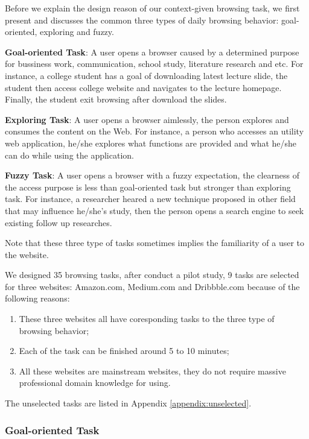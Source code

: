 Before we explain the design reason of our context-given browsing task, we first present
and discusses the common three types of daily browsing behavior: goal-oriented, exploring and fuzzy. 

\textbf{Goal-oriented Task}: A user opens a browser caused by a determined purpose for bussiness work, communication,
school study, literature research and etc.
For instance, a college student has a goal of downloading latest lecture slide, the student then
access college website and navigates to the lecture homepage. Finally, the student exit 
browsing after download the slides.

\textbf{Exploring Task}: A user opens a browser aimlessly, the person explores and consumes the content
on the Web. For instance, a person who accesses an utility web application, he/she explores
what functions are provided and what he/she can do while using the application.

\textbf{Fuzzy Task}: A user opens a browser with a fuzzy expectation, the clearness of the access purpose
is less than goal-oriented task but stronger than exploring task.
For instance, a researcher heared a new technique proposed in other field that may influence he/she's study, 
then the person opens a search engine to seek existing follow up researches.

Note that these three type of tasks sometimes implies the familiarity of a user to the website.

We designed 35 browsing tasks, after conduct a pilot study, 
9 tasks are selected for three websites: Amazon.com, Medium.com and Dribbble.com because of the following reasons:

\begin{enumerate}
    \item These three websites all have coresponding tasks to the three type of browsing behavior;
    \item Each of the task can be finished around 5 to 10 minutes;
    \item All these websites are mainstream websites, they do not require 
        massive professional domain knowledge for using.
\end{enumerate}

The unselected tasks are listed in Appendix \ref{appendix:unselected}.

\subsubsection{Goal-oriented Task}


